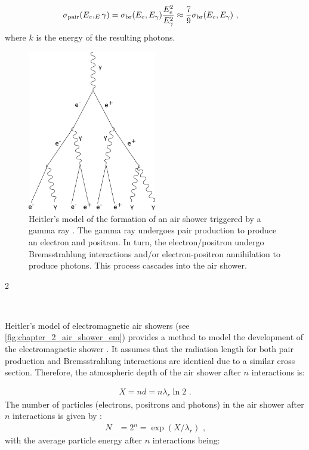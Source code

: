 \begin{equation}
    \begin{aligned}
    \sigma_\text{pair}\qty(E_e,_E\gamma)&=\sigma_\text{br}\qty(E_e,E_\gamma)\frac{E_e^2}{E_\gamma^2}\approx \frac{7}{9}\sigma_\text{br}\qty(E_e,E_\gamma)\text{ ,}
    \end{aligned} \label{eq:chapter_2_pair_prod_cs}
\end{equation}
where $k$ is the energy of the resulting photons.
\begin{figure}
    \includegraphics[width=0.5\textwidth]{05_Astronomy/Images/air_shower/gamma_ray.png}
    \caption{Heitler's model of the formation of an air shower triggered by a gamma ray \citep{1954qtr..book.....H}. The gamma ray undergoes pair production to produce an electron and positron. In turn, the electron/positron undergo Bremsstrahlung interactions and/or electron-positron annihilation to produce photons. This process cascades into the air shower.}
    \label{fig:chapter_2_air_shower_em}
\end{figure}2
\par~\par 
Heitler's model of electromagnetic air showers (see \autoref{fig:chapter_2_air_shower_em}) provides a method to model the development of the electromagnetic shower \citep{1934RSPSA.146...83B}. It assumes that the radiation length for both pair production and Bremsstrahlung interactions are identical due to a similar cross section. Therefore, the atmospheric depth of the air shower after $n$ interactions is:

\begin{equation}
    \begin{aligned}
    X=nd=n\lambda_r\ln 2\text{ .}
    \end{aligned} \label{eq:chapter_2_gas_depth}
\end{equation}
\noindent The number of particles (electrons, positrons and photons) in the air shower after $n$ interactions is given by \citep{MATTHEWS2005387}:
\begin{equation}
    \begin{aligned}
    N&=2^n=\exp(X/\lambda_r)\text{ ,}
    \end{aligned}
\end{equation}
\noindent with the average particle energy after $n$ interactions being:

